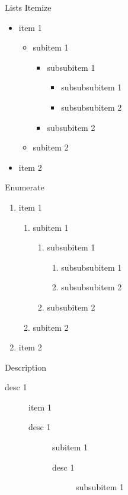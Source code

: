 \documentclass[a0paper,portrait]{baposter}
\begin{document}
\begin{poster}
\begin{posterbox}[name=lists,column=0,below=usage]{Lists}
Itemize
\begin{itemize}
  \item item 1
    \begin{itemize}
      \item subitem 1
        \begin{itemize}
          \item subsubitem 1
            \begin{itemize}
              \item subsubsubitem 1
              \item subsubsubitem 2
            \end{itemize}
          \item subsubitem 2
        \end{itemize}
      \item subitem 2
    \end{itemize}
  \item item 2
\end{itemize}
Enumerate
\begin{enumerate}
  \item item 1
    \begin{enumerate}
      \item subitem 1
        \begin{enumerate}
          \item subsubitem 1
            \begin{enumerate}
              \item subsubsubitem 1
              \item subsubsubitem 2
            \end{enumerate}
          \item subsubitem 2
        \end{enumerate}
      \item subitem 2
    \end{enumerate}
  \item item 2
\end{enumerate}
Description
\begin{description}
  \item[desc 1] item 1
    \begin{description}
      \item[desc 1] subitem 1
        \begin{description}
          \item[desc 1] subsubitem 1
            \begin{description}

\end{description}
\end{description}
\end{description}
\end{description}
\end{posterbox}
\end{poster}
\end{document}
